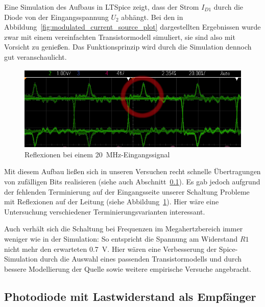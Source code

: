 \documentclass[12pt,a4paper]{article}
\begin{document}
Eine Simulation des Aufbaus in LTSpice zeigt, dass der Strom $I_{D1}$ durch die Diode von der Eingangsspannung $U_2$ abhängt. Bei den in Abbildung~\ref{fig:modulated_current_source_plot} dargestellten Ergebnissen wurde zwar mit einem vereinfachten Transistormodell simuliert, sie sind also mit Vorsicht zu genießen. Das Funktionsprinzip wird durch die Simulation dennoch gut veranschaulicht.

\begin{figure}[H]
  \centering
    \includegraphics[width=1.0\textwidth]{img/ring_20MHz.png}
  \caption{Reflexionen bei einem \SI{20}{\mega\hertz}-Eingangssignal}
  \label{fig:ring_20mhz}
\end{figure}

Mit diesem Aufbau ließen sich in unseren Versuchen recht schnelle Übertragungen von zufälligen Bits realisieren (siehe auch Abschnitt~\ref{sec:direct_rx}). Es gab jedoch aufgrund der fehlenden Terminierung auf der Eingangsseite unserer Schaltung Probleme mit Reflexionen auf der Leitung (siehe Abbildung~\ref{fig:ring_20mhz}). Hier wäre eine Untersuchung verschiedener Terminierungsvarianten interessant.

Auch verhält sich die Schaltung bei Frequenzen im Megahertzbereich immer weniger wie in der Simulation: So entspricht die Spannung am Widerstand $R1$ nicht mehr den erwarteten \SI{0.7}{\volt}. Hier wären eine Verbesserung der Spice-Simulation durch die Auswahl eines passenden Transistormodells und durch bessere Modellierung der Quelle sowie weitere empirische Versuche angebracht.

\subsection{Photodiode mit Lastwiderstand als Empfänger}
\label{sec:direct_rx}
\end{document}
